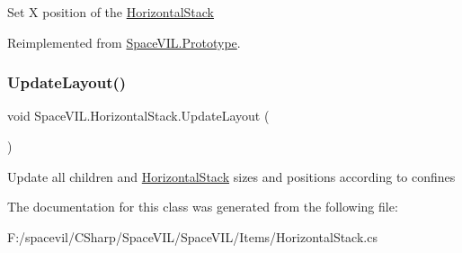 Set X position of the \mbox{\hyperlink{class_space_v_i_l_1_1_horizontal_stack}{Horizontal\+Stack}} 



Reimplemented from \mbox{\hyperlink{class_space_v_i_l_1_1_prototype}{Space\+V\+I\+L.\+Prototype}}.

\mbox{\label{class_space_v_i_l_1_1_horizontal_stack_ace785e253da273b8eb7d247506f2e747}} 
\subsubsection{\texorpdfstring{Update\+Layout()}{UpdateLayout()}}
{\footnotesize\ttfamily void Space\+V\+I\+L.\+Horizontal\+Stack.\+Update\+Layout (\begin{DoxyParamCaption}{ }\end{DoxyParamCaption})}



Update all children and \mbox{\hyperlink{class_space_v_i_l_1_1_horizontal_stack}{Horizontal\+Stack}} sizes and positions according to confines 



The documentation for this class was generated from the following file\+:\begin{DoxyCompactItemize}
\item 
F\+:/spacevil/\+C\+Sharp/\+Space\+V\+I\+L/\+Space\+V\+I\+L/\+Items/Horizontal\+Stack.\+cs\end{DoxyCompactItemize}
